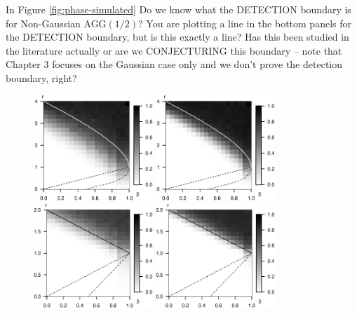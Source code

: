       {In Figure \ref{fig:phase-simulated}
      Do we know what the DETECTION boundary is for Non-Gaussian  AGG$(1/2)$?  You are plotting a line in the 
      bottom panels for the DETECTION boundary, but is this exactly a line?  Has this been studied in the literature 
      actually or are we CONJECTURING this boundary -- note that Chapter 3 focuses on the Gaussian case only and we don't prove the detection 
      boundary, right?}
      
\begin{figure}
      \centering
      \includegraphics[width=0.4\textwidth]{./figures/simulated_phase_diagram_p100.eps}
      \includegraphics[width=0.4\textwidth]{./figures/simulated_phase_diagram_p10000.eps}
      \includegraphics[width=0.4\textwidth]{./figures/simulated_phase_diagram_Laplace_p100_4.eps}
      \includegraphics[width=0.4\textwidth]{./figures/simulated_phase_diagram_Laplace_p10000_4.eps}

\end{figure}

